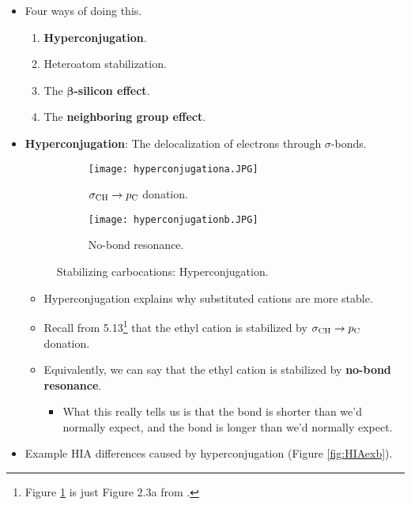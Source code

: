 \documentclass[../notes.tex]{subfiles}
\begin{document}
\begin{itemize}
    \item Four ways of doing this.
    \begin{enumerate}
        \item \textbf{Hyperconjugation}.
        \item Heteroatom stabilization.
        \item The \textbf{$\bm{\beta}$-silicon effect}.
        \item The \textbf{neighboring group effect}.
    \end{enumerate}
    \item \textbf{Hyperconjugation}: The delocalization of electrons through $\sigma$-bonds.
    \begin{figure}[h!]
        \centering
        \begin{subfigure}[b]{0.3\linewidth}
            \centering
            \texttt{[image: hyperconjugationa.JPG]}
            \caption{$\sigma_{\ce{CH}}\to p_{\ce{C}}$ donation.}
            \label{fig:hyperconjugationa}
        \end{subfigure}
        \begin{subfigure}[b]{0.3\linewidth}
            \centering
            \texttt{[image: hyperconjugationb.JPG]}
            \caption{No-bond resonance.}
            \label{fig:hyperconjugationb}
        \end{subfigure}
        \caption{Stabilizing carbocations: Hyperconjugation.}
        \label{fig:hyperconjugation}
    \end{figure}
    \begin{itemize}
        \item Hyperconjugation explains why substituted cations are more stable.
        \item Recall from 5.13\footnote{Figure \ref{fig:hyperconjugationa} is just Figure 2.3a from \textcite{bib:5-13Notes}.} that the ethyl cation is stabilized by $\sigma_{\ce{CH}}\to p_{\ce{C}}$ donation.
        \item Equivalently, we can say that the ethyl cation is stabilized by \textbf{no-bond resonance}.
        \begin{itemize}
            \item What this really tells us is that the  bond is shorter than we'd normally expect, and the  bond is longer than we'd normally expect.
        \end{itemize}
    \end{itemize}
    \pagebreak
    \item Example HIA differences caused by hyperconjugation (Figure \ref{fig:HIAexb}).

\end{itemize}
\end{document}
